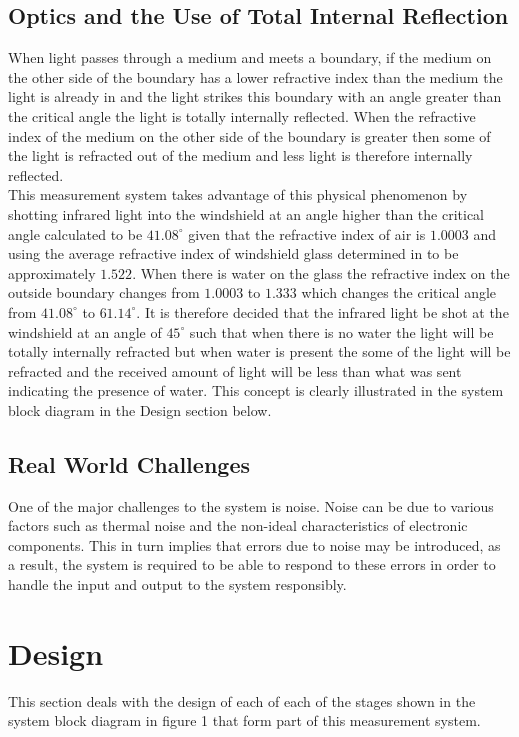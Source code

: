 \documentclass[conference, 11pt]{IEEEtran}
\begin{document}
	
\subsection{Optics and the Use of Total Internal Reflection}
When light passes through a medium and meets a boundary, if the medium on the other side of the boundary has a lower refractive index than the medium the light is already in and the light strikes this boundary with an angle greater than the critical angle the light is totally internally reflected. When the refractive index of the medium on the other side of the boundary is greater then some of the light is refracted out of the medium and less light is therefore internally reflected. \\

This measurement system takes advantage of this physical phenomenon by shotting infrared light into the windshield at an angle higher than the critical angle calculated to be $41.08 ^{\circ}$ given that the refractive index of air is $1.0003$ and using the average refractive index of windshield glass determined in \cite{RI} to be approximately $1.522$. When there is water on the glass the refractive index on the outside boundary changes from $1.0003$ to $1.333$ which changes the critical angle from $41.08 ^{\circ}$ to $61.14 ^{\circ}$. It is therefore decided that the infrared light be shot at the windshield at an angle of $45 ^{\circ}$ such that when there is no water the light will be totally internally refracted but when water is present the some of the light will be refracted and the received amount of light will be less than what was sent indicating the presence of water. This concept is clearly illustrated in the system block diagram in the Design section below. 

	
\subsection{Real World Challenges}
One of the major challenges to the system is noise. Noise can be due to various factors such as thermal noise and the non-ideal characteristics of electronic components. This in turn implies that errors due to noise may be introduced, as a result, the system is required to be able to respond to these errors in order to handle the input and output to the system responsibly.
\cite{NOISE}
	
\section{Design}
This section deals with the design of each of each of the stages shown in the system block diagram in figure 1 that form part of this measurement system. 
\end{document}
